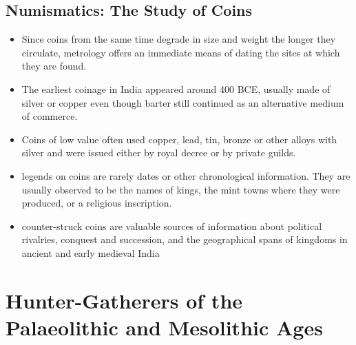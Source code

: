 \subsection{Numismatics: The Study of Coins}
\begin{itemize}
    \item Since coins from the same time degrade in size and weight the longer they circulate, \gls{metrology} offers an immediate means of dating the sites at which they are found.
    \item The earliest \gls{coinage} in India appeared around 400 BCE, usually made of silver or copper even though barter still continued as an alternative medium of commerce.
    \item Coins of low value often used copper, lead, tin, bronze or other alloys with silver and were issued either by royal decree or by private guilds.
    \item \Glspl{legend} on coins are rarely dates or other chronological information. They are usually observed to be the names of kings, the mint towns where they were produced, or a religious inscription.
    \item \Gls{counter-struck} coins are valuable sources of information about political rivalries, conquest and succession, and the geographical spans of kingdoms in ancient and early medieval India
\end{itemize}

\section{Hunter-Gatherers of the Palaeolithic and Mesolithic Ages}

